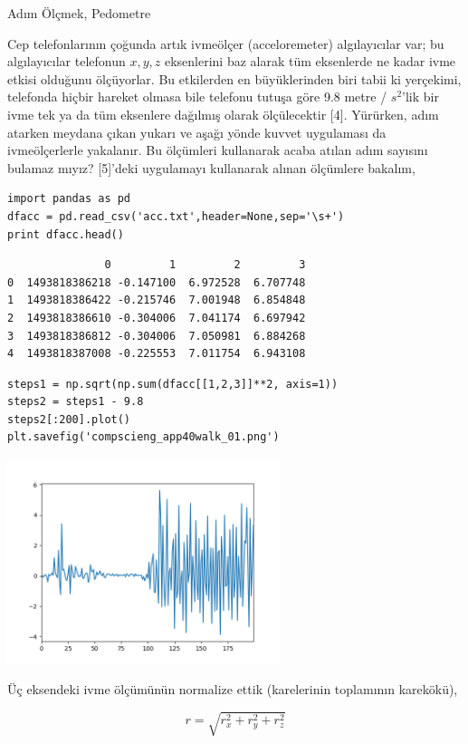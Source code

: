 \documentclass[12pt,fleqn]{article}\usepackage{../../common}
\begin{document}
Adım Ölçmek, Pedometre

Cep telefonlarının çoğunda artık ivmeölçer (acceloremeter) algılayıcılar
var; bu algılayıcılar telefonun $x,y,z$ eksenlerini baz alarak tüm
eksenlerde ne kadar ivme etkisi olduğunu ölçüyorlar. Bu etkilerden en
büyüklerinden biri tabii ki yerçekimi, telefonda hiçbir hareket olmasa bile
telefonu tutuşa göre 9.8 metre / $s^2$'lik bir ivme tek ya da tüm eksenlere
dağılmış olarak ölçülecektir [4]. Yürürken, adım atarken meydana çıkan
yukarı ve aşağı yönde kuvvet uygulaması da ivmeölçerlerle yakalanır. Bu
ölçümleri kullanarak acaba atılan adım sayısını bulamaz mıyız? [5]'deki
uygulamayı kullanarak alınan ölçümlere bakalım,

\begin{verbatim}
import pandas as pd
dfacc = pd.read_csv('acc.txt',header=None,sep='\s+')
print dfacc.head()
\end{verbatim}

\begin{verbatim}
               0         1         2         3
0  1493818386218 -0.147100  6.972528  6.707748
1  1493818386422 -0.215746  7.001948  6.854848
2  1493818386610 -0.304006  7.041174  6.697942
3  1493818386812 -0.304006  7.050981  6.884268
4  1493818387008 -0.225553  7.011754  6.943108
\end{verbatim}

\begin{verbatim}
steps1 = np.sqrt(np.sum(dfacc[[1,2,3]]**2, axis=1))
steps2 = steps1 - 9.8
steps2[:200].plot()
plt.savefig('compscieng_app40walk_01.png')
\end{verbatim}

\includegraphics[height=6cm]{compscieng_app40walk_01.png}

Üç eksendeki ivme ölçümünün normalize ettik (karelerinin toplamının
karekökü), 

$$ r = \sqrt{r_x^2 + r_y^2 + r_z^2}$$
\end{document}
